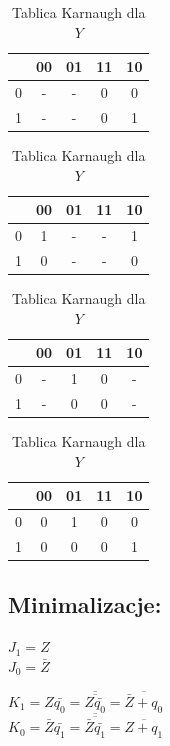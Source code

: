 \documentclass[12pt,a4paper]{article}
\begin{document}
\begin{table}[H]
\begin{minipage}{.5\textwidth}
				\caption{Tablica Karnaugh dla $K_1$}
				\vspace{0.2cm}
				\centering
				\begin{tabular}{c|c|c|c|c}
					\backslashbox{$Z$}{$q_1q_0$}	&	00	&	01	&	11	&	10	\\\hline
					0	&	-	&	-	&	0	&	0	\\\hline
					1	&	-	&	-	&	0	&	1	
				\end{tabular}
			\vspace{1cm}
			
				\caption{Tablica Karnaugh dla $J_0$}
				\vspace{0.2cm}
				\centering
				\begin{tabular}{c|c|c|c|c}
					\backslashbox{$Z$}{$q_1q_0$}	&	00	&	01	&	11	&	10	\\\hline
					0	&	1	&	-	&	-	&	1	\\\hline
					1	&	0	&	-	&	-	&	0	
				\end{tabular}
				
				\caption{Tablica Karnaugh dla $K_0$}
				\vspace{0.2cm}
				\centering
				\begin{tabular}{c|c|c|c|c}
					\backslashbox{$Z$}{$q_1q_0$}	&	00	&	01	&	11	&	10	\\\hline
					0	&	-	&	1	&	0	&	-	\\\hline
					1	&	-	&	0	&	0	&	-	
				\end{tabular}
			\vspace{1cm}
			
				\caption{Tablica Karnaugh dla $Y$}
				\vspace{0.2cm}
				\centering
				\begin{tabular}{c|c|c|c|c}
					\backslashbox{$Z$}{$q_1q_0$}	&	00	&	01	&	11	&	10	\\\hline
					0	&	0	&	1	&	0	&	0	\\\hline
					1	&	0	&	0	&	0	&	1	
				\end{tabular}
			\end{minipage}
			\end{table}
		
		\subsection{Minimalizacje:}
		
		\vspace{1cm}
		\begin{minipage}{.5\textwidth}
			\centering
			\(J_1=Z\)\\
			\(J_0=\bar{Z}\)
			
		\end{minipage}%
		\begin{minipage}{.5\textwidth}
			\centering
			\(K_1	=Z\bar{q_0}	=\overline{\overline{Z\bar{q_0}}}	=\overline{\bar{Z}+q_0}\)\\
			\(K_0	=\bar{Z}\bar{q_1}	=\overline{\overline{\bar{Z}\bar{q_1}}}	=\overline{Z+q_1}\)
		\end{minipage}
		
\end{document}
